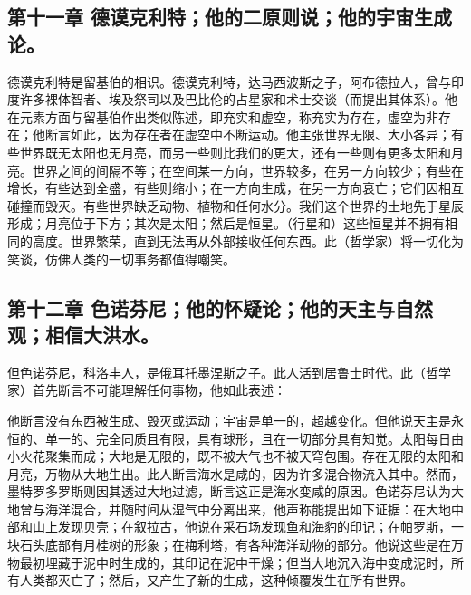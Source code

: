 
\subsection{第十一章 德谟克利特；他的二原则说；他的宇宙生成论。}

德谟克利特是留基伯的相识。德谟克利特，达马西波斯之子，阿布德拉人，曾与印度许多裸体智者、埃及祭司以及巴比伦的占星家和术士交谈（而提出其体系）。他在元素方面与留基伯作出类似陈述，即充实和虚空，称充实为存在，虚空为非存在；他断言如此，因为存在者在虚空中不断运动。他主张世界无限、大小各异；有些世界既无太阳也无月亮，而另一些则比我们的更大，还有一些则有更多太阳和月亮。世界之间的间隔不等；在空间某一方向，世界较多，在另一方向较少；有些在增长，有些达到全盛，有些则缩小；在一方向生成，在另一方向衰亡；它们因相互碰撞而毁灭。有些世界缺乏动物、植物和任何水分。我们这个世界的土地先于星辰形成；月亮位于下方；其次是太阳；然后是恒星。（行星和）这些恒星并不拥有相同的高度。世界繁荣，直到无法再从外部接收任何东西。此（哲学家）将一切化为笑谈，仿佛人类的一切事务都值得嘲笑。\par


\subsection{第十二章 色诺芬尼；他的怀疑论；他的天主与自然观；相信大洪水。}

但色诺芬尼，科洛丰人，是俄耳托墨涅斯之子。此人活到居鲁士时代。此（哲学家）首先断言不可能理解任何事物，他如此表述：\par

\par

他断言没有东西被生成、毁灭或运动；宇宙是单一的，超越变化。但他说天主是永恒的、单一的、完全同质且有限，具有球形，且在一切部分具有知觉。太阳每日由小火花聚集而成；大地是无限的，既不被大气也不被天穹包围。存在无限的太阳和月亮，万物从大地生出。此人断言海水是咸的，因为许多混合物流入其中。然而，墨特罗多罗斯则因其透过大地过滤，断言这正是海水变咸的原因。色诺芬尼认为大地曾与海洋混合，并随时间从湿气中分离出来，他声称能提出如下证据：在大地中部和山上发现贝壳；在叙拉古，他说在采石场发现鱼和海豹的印记；在帕罗斯，一块石头底部有月桂树的形象；在梅利塔，有各种海洋动物的部分。他说这些是在万物最初埋藏于泥中时生成的，其印记在泥中干燥；但当大地沉入海中变成泥时，所有人类都灭亡了；然后，又产生了新的生成，这种倾覆发生在所有世界。\par

